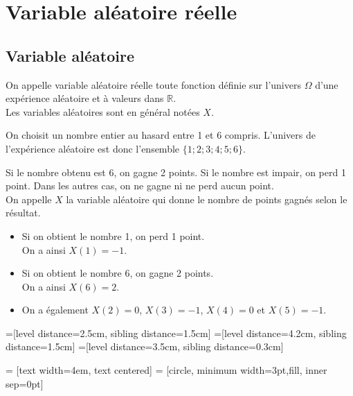 \documentclass[11pt,fleqn, openany]{book} %
\begin{document}
\section{Variable aléatoire réelle}

\subsection{Variable aléatoire}

\begin{definition}On appelle variable aléatoire réelle toute fonction définie sur l'univers $\Omega$ d'une expérience aléatoire et à valeurs dans $\mathbb{R}$.\\
Les variables aléatoires sont en général notées $X$.\end{definition}

\begin{minipage}{0.55\linewidth}\begin{example}On choisit un nombre entier au hasard entre 1 et 6 compris. L'univers de l'expérience aléatoire est donc l'ensemble $\{1;2;3;4;5;6\}$.

Si le nombre obtenu est 6, on gagne 2 points. Si le nombre est impair, on perd 1 point. Dans les autres cas, on ne gagne ni ne perd aucun point.\\
On appelle $X$ la variable aléatoire qui donne le nombre de points gagnés selon le résultat.
\begin{itemize}
\item Si on obtient le nombre 1, on perd 1 point. \\On a ainsi $X(1)=-1$.
\item Si on obtient le nombre 6, on gagne 2 points. \\On a ainsi $X(6)=2$.
\item On a également $X(2)=0$, $X(3)=-1$, $X(4)=0$ et $X(5)=-1$.
\end{itemize}\end{example}
\end{minipage}\hfill\begin{minipage}{0.43\linewidth}

=[level distance=2.5cm, sibling distance=1.5cm]
=[level distance=4.2cm, sibling distance=1.5cm]
=[level distance=3.5cm, sibling distance=0.3cm]

 = [text width=4em, text centered]
 = [circle, minimum width=3pt,fill, inner sep=0pt]



\end{minipage}
\end{document}
